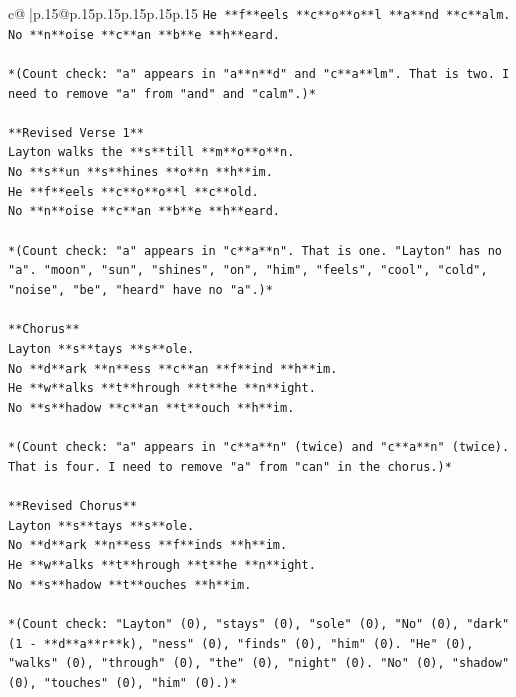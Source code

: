 \documentclass{article}
\begin{document}
{\begin{supertabular}{c@{$\;$}|p{.15\linewidth}@{}p{.15\linewidth}p{.15\linewidth}p{.15\linewidth}p{.15\linewidth}p{.15\linewidth}}
{{{\texttt{He **f**eels **c**o**o**l **a**nd **c**alm.} \\
\texttt{No **n**oise **c**an **b**e **h**eard.} \\
\\ 
\texttt{*(Count check: "a" appears in "a**n**d" and "c**a**lm". That is two. I need to remove "a" from "and" and "calm".)*} \\
\\ 
\texttt{**Revised Verse 1**} \\
\texttt{Layton walks the **s**till **m**o**o**n.} \\
\texttt{No **s**un **s**hines **o**n **h**im.} \\
\texttt{He **f**eels **c**o**o**l **c**old.} \\
\texttt{No **n**oise **c**an **b**e **h**eard.} \\
\\ 
\texttt{*(Count check: "a" appears in "c**a**n". That is one. "Layton" has no "a". "moon", "sun", "shines", "on", "him", "feels", "cool", "cold", "noise", "be", "heard" have no "a".)*} \\
\\ 
\texttt{**Chorus**} \\
\texttt{Layton **s**tays **s**ole.} \\
\texttt{No **d**ark **n**ess **c**an **f**ind **h**im.} \\
\texttt{He **w**alks **t**hrough **t**he **n**ight.} \\
\texttt{No **s**hadow **c**an **t**ouch **h**im.} \\
\\ 
\texttt{*(Count check: "a" appears in "c**a**n" (twice) and "c**a**n" (twice). That is four. I need to remove "a" from "can" in the chorus.)*} \\
\\ 
\texttt{**Revised Chorus**} \\
\texttt{Layton **s**tays **s**ole.} \\
\texttt{No **d**ark **n**ess **f**inds **h**im.} \\
\texttt{He **w**alks **t**hrough **t**he **n**ight.} \\
\texttt{No **s**hadow **t**ouches **h**im.} \\
\\ 
\texttt{*(Count check: "Layton" (0), "stays" (0), "sole" (0), "No" (0), "dark" (1 {-} **d**a**r**k), "ness" (0), "finds" (0), "him" (0). "He" (0), "walks" (0), "through" (0), "the" (0), "night" (0). "No" (0), "shadow" (0), "touches" (0), "him" (0).)*} \\
}}}
\end{supertabular}}
\end{document}
